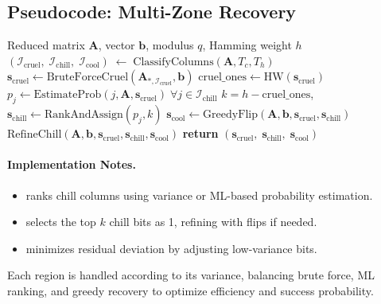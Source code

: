 \documentclass[conference]{IEEEtran}
\begin{document}
\subsection{Pseudocode: Multi-Zone Recovery}
\label{subsec:multi-zone-pseudocode}

\begin{algorithm}[ht]
\caption{\small Multi-Zone Attack: Cool, Chill, and Cruel}
\label{alg:ccc-attack}
\begin{algorithmic}[1]
\Require Reduced matrix $\mathbf{A}$, vector $\mathbf{b}$, modulus $q$, Hamming weight $h$
\State $(\mathcal{I}_{\mathrm{cruel}},\;\mathcal{I}_{\mathrm{chill}},\;\mathcal{I}_{\mathrm{cool}}) \;\gets\; \text{ClassifyColumns}(\mathbf{A}, T_c, T_h)$
\State $\mathbf{s}_{\mathrm{cruel}} \gets \mathrm{BruteForceCruel}(\mathbf{A}_{*,\mathcal{I}_{\mathrm{cruel}}}, \mathbf{b})$
\State $\mathrm{cruel\_ones} \gets \mathrm{HW}(\mathbf{s}_{\mathrm{cruel}})$
\State $p_j \gets \mathrm{EstimateProb}(j,\mathbf{A},\mathbf{s}_{\mathrm{cruel}})\; \forall j\in \mathcal{I}_{\mathrm{chill}}$
\State $k = h - \mathrm{cruel\_ones}$, $\mathbf{s}_{\mathrm{chill}} \gets \mathrm{RankAndAssign}(p_j,k)$
\State $\mathbf{s}_{\mathrm{cool}} \gets \mathrm{GreedyFlip}(\mathbf{A},\mathbf{b},\mathbf{s}_{\mathrm{cruel}},\mathbf{s}_{\mathrm{chill}})$
\State $\mathrm{RefineChill}(\mathbf{A},\mathbf{b},\mathbf{s}_{\mathrm{cruel}},\mathbf{s}_{\mathrm{chill}},\mathbf{s}_{\mathrm{cool}})$
\State \textbf{return} $(\mathbf{s}_{\mathrm{cruel}},\;\mathbf{s}_{\mathrm{chill}},\;\mathbf{s}_{\mathrm{cool}})$
\end{algorithmic}
\end{algorithm}

\paragraph{Implementation Notes.}
\begin{itemize}
\item {} ranks chill columns using variance or ML-based probability estimation.
\item {} selects the top \( k \) chill bits as 1, refining with flips if needed.
\item {} minimizes residual deviation by adjusting low-variance bits.
\end{itemize}

Each region is handled according to its variance, balancing brute force, ML ranking, and greedy recovery to optimize efficiency and success probability.
\end{document}
